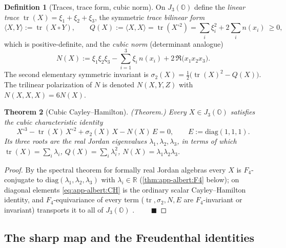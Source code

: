 \documentclass[11pt]{article}
\theoremstyle{plain}
\newtheorem{theorem}{Theorem}[section]
\theoremstyle{definition}
\newtheorem{definition}[theorem]{Definition}
\theoremstyle{remark}
\begin{document}
\begin{definition}[Traces, trace form, cubic norm]\label{def:app-albert:invariants}
On $J_3(\mathbb O)$ define the \emph{linear trace}
$\operatorname{tr}(X)=\xi_1+\xi_2+\xi_3$, the symmetric \emph{trace bilinear form}
\begin{equation}\label{eq:app-albert:Q}
  \langle X,Y\rangle:=\operatorname{tr}(X\circ Y),
  \qquad
  Q(X):=\langle X,X\rangle=\operatorname{tr}(X^{\circ2})
  =\sum_i\xi_i^2+2\sum_i n(x_i)\ \ge 0,
\end{equation}
which is positive-definite, and the \emph{cubic norm} (determinant analogue)
\begin{equation}\label{eq:app-albert:N}
  N(X):=\xi_1\xi_2\xi_3-\sum_{i=1}^{3}\xi_i\,n(x_i)+2\,\Re\!\bigl(x_1 x_2 x_3\bigr).
\end{equation}
The second elementary symmetric invariant is
$\sigma_2(X)=\tfrac12\bigl(\operatorname{tr}(X)^2-Q(X)\bigr)$. The trilinear
polarization of $N$ is denoted $N(X,Y,Z)$ with $N(X,X,X)=6N(X)$.
\end{definition}

\begin{theorem}[Cubic Cayley--Hamilton]\label{thm:app-albert:CH}
\textup{(Theorem.)}
Every $X\in J_3(\mathbb O)$ satisfies the cubic characteristic identity
\begin{equation}\label{eq:app-albert:CH}
  X^{\circ3}-\operatorname{tr}(X)\,X^{\circ2}+\sigma_2(X)\,X-N(X)\,E=0,
  \qquad E:=\mathrm{diag}(1,1,1).
\end{equation}
Its three roots are the real \emph{Jordan eigenvalues}
$\lambda_1,\lambda_2,\lambda_3$, in terms of which
$\operatorname{tr}(X)=\sum_i\lambda_i$, $Q(X)=\sum_i\lambda_i^2$,
$N(X)=\lambda_1\lambda_2\lambda_3$.
\end{theorem}

\begin{proof}
By the spectral theorem for formally real Jordan algebras every $X$ is
$F_4$-conjugate to $\mathrm{diag}(\lambda_1,\lambda_2,\lambda_3)$ with
$\lambda_i\in\mathbb R$ (\autoref{thm:app-albert:F4} below); on diagonal elements
\eqref{eq:app-albert:CH} is the ordinary scalar Cayley--Hamilton identity, and
$F_4$-equivariance of every term ($\operatorname{tr},\sigma_2,N,E$ are
$F_4$-invariant or invariant) transports it to all of $J_3(\mathbb O)$
\cite{McCrimmon:2004,Springer:2000}. $\qquad\blacksquare$
\end{proof}

\subsection{The sharp map and the Freudenthal identities}
\label{sec:app-albert:sharp}
\end{document}
